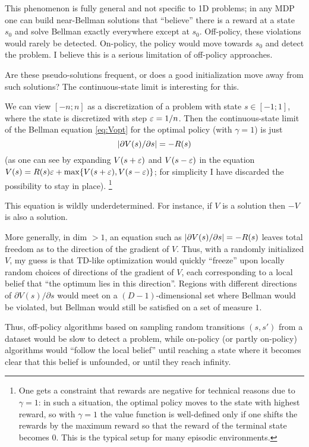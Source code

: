 \documentclass[11pt,a4paper]{article}
\begin{document}
This phenomenon is fully general and not specific to 1D problems; in any
MDP one can build near-Bellman solutions
that ``believe'' there is a reward at a state $s_0$ and solve Bellman
exactly everywhere except at $s_0$. Off-policy, these violations would
rarely be
detected. On-policy, the policy would move towards $s_0$ and detect the
problem. I believe this is a serious limitation of off-policy approaches.

Are these pseudo-solutions frequent, or does a good initialization move
away from such solutions?
The continuous-state limit is interesting for this.

We can view $[-n;n]$ as a
discretization of a problem with state $s\in [-1;1]$, where the state is
discretized with step $\varepsilon=1/n$. Then the continuous-state limit of the
Bellman equation \eqref{eq:Vopt} for the optimal policy (with $\gamma=1$)
is just
\begin{equation}
\left\lvert\partial V(s)/\partial s\right\rvert=-R(s)
\end{equation}
(as one can see by expanding $V(s+\varepsilon)$ and $V(s-\varepsilon)$ in the equation
$V(s)=R(s)\varepsilon +\max \{V(s+\varepsilon),V(s-\varepsilon)\}$; for simplicity I have
discarded the possibility to stay in place). \footnote{One gets a constraint that
rewards are negative for technical reasons due to $\gamma=1$: in such a situation, the optimal policy
moves to the state with highest reward, so with $\gamma=1$ the value
function is well-defined only if one shifts the rewards by the maximum
reward so that the reward of the terminal state becomes $0$. This is the
typical setup for many episodic environments.}

This equation is wildly underdetermined. For instance, if $V$ is a
solution then $-V$ is also a solution.

More generally, in dim $>1$, an equation such as $\left\lvert\partial
V(s)/\partial s\right\rvert=-R(s)$ leaves total freedom as to the direction of the
gradient of $V$. Thus, with a randomly initialized $V$, my guess is that
TD-like optimization would quickly ``freeze'' upon locally random choices of 
directions of the gradient of $V$, each corresponding to a local belief
that ``the optimum lies in this direction''. Regions with different
directions of $\partial
V(s)/\partial s$ would meet on a $(D-1)$-dimensional set where Bellman
would be violated, but Bellman would still be satisfied on a set of
measure $1$.

Thus, off-policy algorithms based on sampling random transitions $(s,s')$
from a dataset would be slow to detect a problem, while on-policy (or
partly on-policy) algorithms would ``follow the local belief'' until
reaching a state where it becomes clear that this belief is unfounded, or
until they reach infinity.
\end{document}
